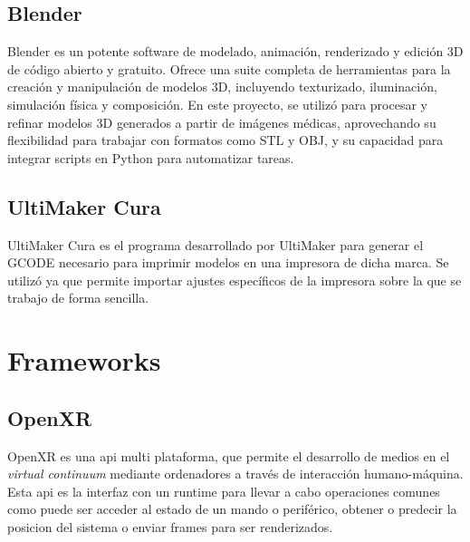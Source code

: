     \subsection{Blender}
Blender es un potente software de modelado, animación, renderizado y edición 3D de código abierto y gratuito. Ofrece una suite completa de herramientas para la creación y manipulación de modelos 3D, incluyendo texturizado, iluminación, simulación física y composición. En este proyecto, se utilizó para procesar y refinar modelos 3D generados a partir de imágenes médicas, aprovechando su flexibilidad para trabajar con formatos como STL y OBJ, y su capacidad para integrar scripts en Python para automatizar tareas.
    \subsection{UltiMaker Cura}
UltiMaker Cura es el programa desarrollado por UltiMaker para generar el GCODE necesario para imprimir modelos en una impresora de dicha marca. Se utilizó ya que permite importar ajustes específicos de la impresora sobre la que se trabajo de forma sencilla.
\section{Frameworks}
\subsection{OpenXR}
OpenXR es una \acrfull{api} multi plataforma, que permite el desarrollo de medios en el \textit{virtual continuum} mediante ordenadores a través de interacción  humano-máquina.
Esta \acrshort{api} es la interfaz con un runtime para llevar a cabo operaciones comunes como puede ser acceder al estado de un mando o periférico, obtener o predecir la posicion del sistema o enviar frames para ser renderizados.

